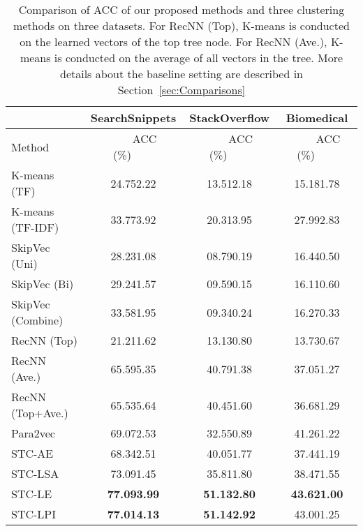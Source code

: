 \documentclass[review]{elsarticle}
\begin{document}
\begin{table*}[t] \begin{center}
\begin{tabular}{|l|c|c|c|}\hline
&SearchSnippets &StackOverflow &Biomedical\\\hline
Method     &~~~~ACC (\%)~~~~&~~~~ACC (\%)~~~~&~~~~ACC (\%)~~~~\\\hline \hline
K-means (TF)& 24.752.22        & 13.512.18  & 15.181.78    \\
K-means (TF-IDF)& 33.773.92    & 20.313.95  & 27.992.83 \\
SkipVec (Uni) & 28.231.08           & 08.790.19  & 16.440.50 \\
SkipVec (Bi)  & 29.241.57           & 09.590.15  & 16.110.60 \\
SkipVec (Combine)  & 33.581.95      & 09.340.24  & 16.270.33 \\
RecNN (Top) & 21.211.62     	&13.130.80	  &13.730.67\\
RecNN (Ave.) & 65.595.35		&40.791.38	  &37.051.27\\
RecNN (Top+Ave.) & 65.535.64	&40.451.60	  &36.681.29\\
Para2vec & 69.072.53	&32.550.89	  &41.261.22\\
\hline
STC-AE& 68.342.51& 40.051.77	  &37.441.19\\
STC-LSA& 73.091.45	& 35.811.80	   &38.471.55\\
STC-LE& {\bf{77.093.99}} & {\bf{51.132.80}}	     &{\bf{43.621.00}}\\
STC-LPI& {\bf{77.014.13}}	& {\bf{51.142.92}}	&43.001.25\\\hline

\end{tabular}
\end{center}
\caption{\label{tb:Comparison} Comparison of ACC of our proposed methods and three clustering methods on three datasets. For RecNN (Top), K-means is conducted on the learned vectors of the top tree node. For RecNN (Ave.), K-means is conducted on the average of all vectors in the tree. More details about the baseline setting are described in Section~\ref{sec:Comparisons}}
\end{table*}
\end{document}
